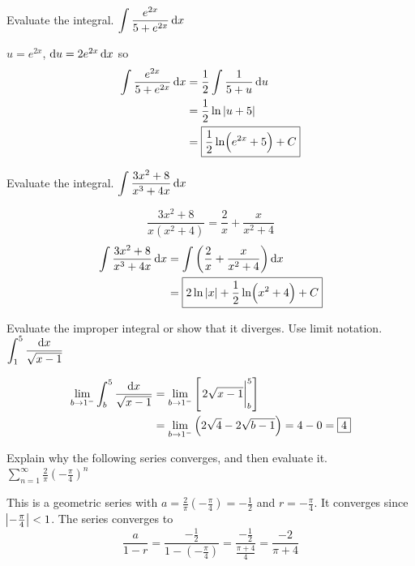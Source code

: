 \documentclass[12pt,answers]{exam}
\begin{document}
\begin{questions}
\newpage
\question[10]
Evaluate the integral.
$\displaystyle \int \frac{e^{2x}}{5+e^{2x}} \dif x$
\begin{solution}
    $u = e^{2x}$, $\dif u = 2e^{2x} \dif x$
    so
    \begin{align*}
        \int \frac{e^{2x}}{5+e^{2x}} \dif x
        &= \frac 12 \int \frac{1}{5+u} \dif u \\ 
        &= \frac 12 \ln|u+5| \\
        &= \boxed{\frac 12 \ln(e^{2x} + 5) + C}
    \end{align*}
\end{solution}

\question[12]
Evaluate the integral.
$\displaystyle \int \frac{3x^2+8}{x^3+4x} \dif x$
\begin{solution}
    \[
        \frac{3x^2+8}{x(x^2+4)} = \frac{2}{x} + \frac{x}{x^2+4}
    \]
    \begin{align*}
        \int \frac{3x^2+8}{x^3+4x} \dif x
        &= \int \left( \frac2x + \frac{x}{x^2 + 4}\right) \dif x \\ 
        &= \boxed{2 \ln|x| + \frac12 \ln(x^2+4) + C}
    \end{align*}
\end{solution}

\question[10] 
Evaluate the improper integral or show that it diverges. Use limit notation.
$\displaystyle \int_1^5 \frac{\dif x}{\sqrt{x-1}}$
\begin{solution}
    \begin{align*}
        \lim_{b\to1^-} \int_b^5 \frac{\dif x}{\sqrt{x-1}}
        &= 
        \lim_{b\to1^-} \left[ \eval{2\sqrt{x-1}}_b^5 \right]\\
        &= 
        \lim_{b\to1^-} \left( 2\sqrt{4} - 2\sqrt{b-1}\right)
        = 4 - 0 = \boxed{4}
    \end{align*}
\end{solution}

\newpage
\question[8]
Explain why the following series converges, and then evaluate it.
\\
$\displaystyle \sum_{n=1}^\infty \frac2\pi \left(-\frac\pi4\right)^n$
\begin{solution}
    This is a geometric series with $a = \frac 2\pi (-\frac\pi4) = -\frac12$ and $r= -\frac\pi4$. It converges since $\abs{-\frac\pi4} < 1$.
    The series converges to 
    \[
        \frac{a}{1-r} 
        = \frac{-\frac12}{1-(-\frac\pi4)} 
        = \frac{-\frac12}{\frac{\pi+4}{4}}
        = \boxed{\frac{-2}{\pi+4}}
    \]
\end{solution}


\end{questions}
\end{document}
